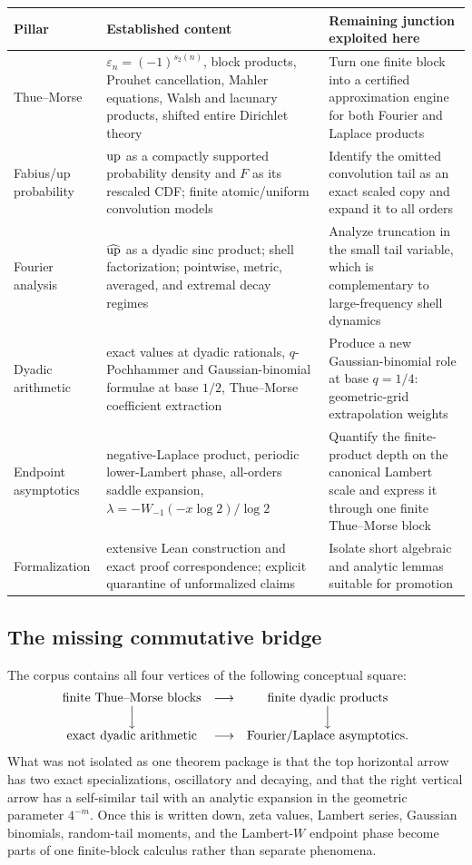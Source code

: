 \documentclass[11pt,oneside]{article}
\numberwithin{equation}{section}
\theoremstyle{definition}
\theoremstyle{remark}
\newcommand{\eps}{\varepsilon}
\begin{document}
\begin{center}
\small
\begin{tabularx}{\textwidth}{@{}p{}X X@{}}
\toprule
Pillar & Established content & Remaining junction exploited here \\
\midrule
Thue--Morse & $\eps_n=(-1)^{s_2(n)}$, block products, Prouhet cancellation, Mahler equations,
Walsh and lacunary products, shifted entire Dirichlet theory & Turn one finite block into a
certified approximation engine for both Fourier and Laplace products \\
Fabius/up probability & $\operatorname{up}$ as a compactly supported probability density and $F$ as its
rescaled CDF; finite atomic/uniform convolution models & Identify the omitted convolution tail
as an exact scaled copy and expand it to all orders \\
Fourier analysis & $\widehat{\operatorname{up}}$ as a dyadic sinc product; shell factorization; pointwise,
metric, averaged, and extremal decay regimes & Analyze truncation in the small tail variable,
which is complementary to large-frequency shell dynamics \\
Dyadic arithmetic & exact values at dyadic rationals, $q$-Pochhammer and Gaussian-binomial
formulae at base $1/2$, Thue--Morse coefficient extraction & Produce a new Gaussian-binomial
role at base $q=1/4$: geometric-grid extrapolation weights \\
Endpoint asymptotics & negative-Laplace product, periodic lower-Lambert phase, all-orders saddle
expansion, $\lambda=-W_{-1}(-x\log2)/\log2$ & Quantify the finite-product depth on the canonical
Lambert scale and express it through one finite Thue--Morse block \\
Formalization & extensive Lean construction and exact proof correspondence; explicit quarantine
of unformalized claims & Isolate short algebraic and analytic lemmas suitable for promotion \\
\bottomrule
\end{tabularx}
\end{center}

\subsection{The missing commutative bridge}

The corpus contains all four vertices of the following conceptual square:
\[
\begin{array}{ccc}
\text{finite Thue--Morse blocks} & \longrightarrow & \text{finite dyadic products}\\
\Big\downarrow && \Big\downarrow\\
\text{exact dyadic arithmetic} & \longrightarrow & \text{Fourier/Laplace asymptotics}.
\end{array}
\]
What was not isolated as one theorem package is that the top horizontal arrow has two exact
specializations, oscillatory and decaying, and that the right vertical arrow has a
self-similar tail with an analytic expansion in the geometric parameter $4^{-m}$.  Once this
is written down, zeta values, Lambert series, Gaussian binomials, random-tail moments, and the
Lambert-$W$ endpoint phase become parts of one finite-block calculus rather than separate
phenomena.
\end{document}

